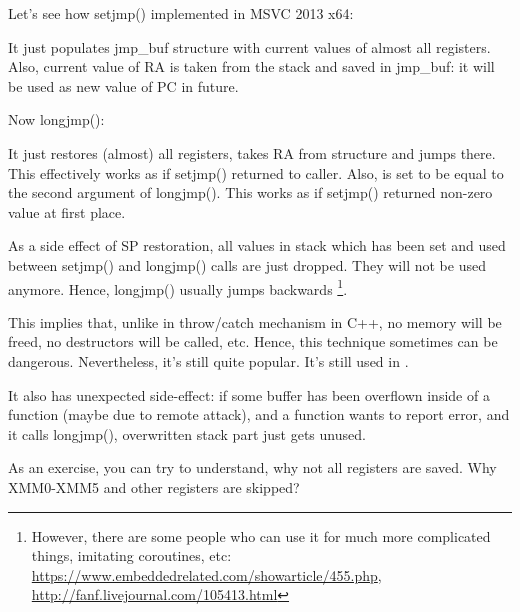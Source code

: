 Let's see how setjmp() implemented in MSVC 2013 x64:



It just populates jmp\_buf structure with current values of almost all registers.
Also, current value of \ac{RA} is taken from the stack and saved in jmp\_buf:
it will be used as new value of \ac{PC} in future.

Now longjmp():



It just restores (almost) all registers, takes \ac{RA} from structure and jumps there.
This effectively works as if setjmp() returned to caller.
Also,  is set to be equal to the second argument of longjmp().
This works as if setjmp() returned non-zero value at first place.

As a side effect of \ac{SP} restoration, all values in stack which has been set and used between setjmp() and longjmp()
calls are just dropped.
They will not be used anymore.
Hence, longjmp() usually jumps backwards
\footnote{However, there are some people who can use it for much more complicated things,
imitating coroutines, etc: \url{https://www.embeddedrelated.com/showarticle/455.php},
\url{http://fanf.livejournal.com/105413.html}}.

This implies that, unlike in throw/catch mechanism in C++, no memory will be freed, no destructors will be called, etc.
Hence, this technique sometimes can be dangerous.
Nevertheless, it's still quite popular. It's still used in \oracle.

It also has unexpected side-effect: if some buffer has been overflown inside of a function (maybe due to remote attack),
and a function wants to report error, and it calls longjmp(), overwritten stack part just gets unused.

As an exercise, you can try to understand, why not all registers are saved.
Why XMM0-XMM5 and other registers are skipped?

